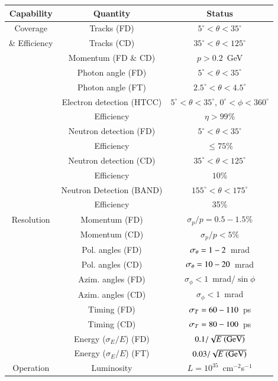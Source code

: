 \documentclass[final,3p]{elsarticle}
\begin{document}
\begin{twocolumn}
\begin{table}[t!]
\begin{center}
\begin{tabular}{c|c|c} \hline
Capability &  Quantity & Status \\ \hline
Coverage&Tracks (FD) & $5^\circ < \theta < 35^\circ $ \\
\& Efficiency &Tracks (CD)& $35^\circ < \theta < 125^\circ$  \\ \cline{2-3}
&Momentum (FD \& CD) & $p > 0.2$~GeV  \\ \cline{2-3}
&Photon angle (FD)& $5^\circ < \theta < 35^\circ$ \\ 
&Photon angle (FT)& $2.5^\circ < \theta < 4.5^\circ$ \\  \cline{2-3} 
&Electron detection (HTCC)& $5^\circ < \theta < 35^\circ$, $0^\circ < \phi < 360^\circ$ \\
&Efficiency & $\eta > 99\%$ \\ \cline{2-3}
&Neutron detection (FD) & $5^\circ < \theta < 35^\circ $ \\
&Efficiency& $\le  75\%$ \\  \cline{2-3}
&Neutron detection (CD) &  $ 35^\circ < \theta < 125^\circ$ \\
&Efficiency& $10\%$ \\ \cline{2-3}
&Neutron Detection (BAND) & $155^\circ < \theta < 175^\circ$\\
&Efficiency & 35\% \\\hline
Resolution & Momentum (FD)& $\sigma_p/p = 0.5-1.5\%$ \\
& Momentum (CD) & $\sigma_p/p  < 5 \%$\\ \cline{2-3}
 & Pol. angles (FD) & $ \sigma_\theta = \rm  1- 2$~mrad  \\
 & Pol. angles (CD) & $\sigma_\theta =  \rm 10- 20$~mrad \\ \cline{2-3}
& Azim. angles (FD) & $\sigma_\phi  < 1$~mrad/$\sin\phi$ \\
& Azim. angles (CD) & $\sigma_\phi < 1$~mrad \\ \cline{2-3}
 & Timing (FD) & $\sigma_T =\rm  60 - 110$~ps  \\
& Timing (CD) & $\sigma_T = \rm 80 - 100 $~ps \\ \cline{2-3}
& Energy ($\sigma_E / E$)  (FD) & $0.1/\sqrt{E~{\rm(GeV)}}$ \\
& Energy ($\sigma_E / E$)  (FT) & $0.03/\sqrt{E~{\rm(GeV)}}$\\ \hline
Operation & Luminosity &  $L = 10^{35}$~cm$^{-2}$s$^{-1}$ \\ \hline

\end{tabular}
\end{center}
\end{table}
\end{twocolumn}
\end{document}
